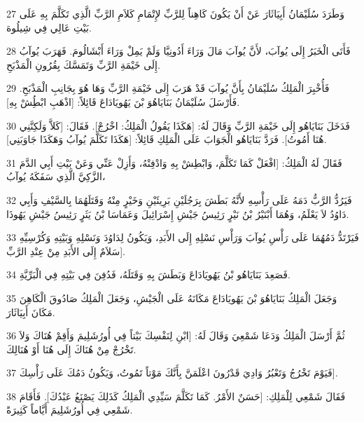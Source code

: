 \par 27 وَطَرَدَ سُلَيْمَانُ أَبِيَاثَارَ عَنْ أَنْ يَكُونَ كَاهِناً لِلرَّبِّ لإِتْمَامِ كَلاَمِ الرَّبِّ الَّذِي تَكَلَّمَ بِهِ عَلَى بَيْتِ عَالِي فِي شِيلُوهَ.
\par 28 فَأَتَى الْخَبَرُ إِلَى يُوآبَ، لأَنَّ يُوآبَ مَالَ وَرَاءَ أَدُونِيَّا وَلَمْ يَمِلْ وَرَاءَ أَبْشَالُومَ. فَهَرَبَ يُوآبُ إِلَى خَيْمَةِ الرَّبِّ وَتَمَسَّكَ بِقُرُونِ الْمَذْبَحِ.
\par 29 فَأُخْبِرَ الْمَلِكُ سُلَيْمَانُ بِأَنَّ يُوآبَ قَدْ هَرَبَ إِلَى خَيْمَةِ الرَّبِّ وَهَا هُوَ بِجَانِبِ الْمَذْبَحِ. فَأَرْسَلَ سُلَيْمَانُ بَنَايَاهُوَ بْنَ يَهُويَادَاعَ قَائِلاً: [اذْهَبِ ابْطُِشْ بِهِ].
\par 30 فَدَخَلَ بَنَايَاهُو إِلَى خَيْمَةِ الرَّبِّ وَقَالَ لَهُ: [هَكَذَا يَقُولُ الْمَلِكُ: اخْرُجْ]. فَقَالَ: [كَلاَّ وَلَكِنَّنِي هُنَا أَمُوتُ]. فَرَدَّ بَنَايَاهُو الْجَوَابَ عَلَى الْمَلِكِ قَائِلاً: [هَكَذَا تَكَلَّمَ يُوآبُ وَهَكَذَا جَاوَبَنِي].
\par 31 فَقَالَ لَهُ الْمَلِكُ: [افْعَلْ كَمَا تَكَلَّمَ، وَابْطِشْ بِهِ وَادْفِنْهُ، وَأَزِلْ عَنِّي وَعَنْ بَيْتِ أَبِي الدَّمَ الزَّكِيَّ الَّذِي سَفَكَهُ يُوآبُ،
\par 32 فَيَرُدُّ الرَّبُّ دَمَهُ عَلَى رَأْسِهِ لأَنَّهُ بَطَشَ بِرَجُلَيْنِ بَرِيئَيْنِ وَخَيْرٍ مِنْهُ وَقَتَلَهُمَا بِالسَّيْفِ وَأَبِي دَاوُدُ لاَ يَعْلَمُ، وَهُمَا أَبْنَيْرُ بْنُ نَيْرٍ رَئِيسُ جَيْشِ إِسْرَائِيلَ وَعَمَاسَا بْنُ يَثَرٍ رَئِيسُ جَيْشِ يَهُوذَا.
\par 33 فَيَرْتَدُّ دَمُهُمَا عَلَى رَأْسِ يُوآبَ وَرَأْسِ نَسْلِهِ إِلَى الأَبَدِ، وَيَكُونُ لِدَاوُدَ وَنَسْلِهِ وَبَيْتِهِ وَكُرْسِيِّهِ سَلاَمٌ إِلَى الأَبَدِ مِنْ عِنْدِ الرَّبِّ].
\par 34 فَصَعِدَ بَنَايَاهُو بْنُ يَهُويَادَاعَ وَبَطَشَ بِهِ وَقَتَلَهُ، فَدُفِنَ فِي بَيْتِهِ فِي الْبَرِّيَّةِ.
\par 35 وَجَعَلَ الْمَلِكُ بَنَايَاهُوَ بْنَ يَهُويَادَاعَ مَكَانَهُ عَلَى الْجَيْشِ، وَجَعَلَ الْمَلِكُ صَادُوقَ الْكَاهِنَ مَكَانَ أَبِيَاثَارَ.
\par 36 ثُمَّ أَرْسَلَ الْمَلِكُ وَدَعَا شَمْعِيَ وَقَالَ لَهُ: [ابْنِ لِنَفْسِكَ بَيْتاً فِي أُورُشَلِيمَ وَأَقِمْ هُنَاكَ وَلاَ تَخْرُجْ مِنْ هُنَاكَ إِلَى هُنَا أَوْ هُنَالِكَ.
\par 37 فَيَوْمَ تَخْرُجُ وَتَعْبُرُ وَادِيَ قَدْرُونَ اعْلَمَنَّ بِأَنَّكَ مَوْتاً تَمُوتُ، وَيَكُونُ دَمُكَ عَلَى رَأْسِكَ].
\par 38 فَقَالَ شَمْعِي لِلْمَلِكِ: [حَسَنٌ الأَمْرُ. كَمَا تَكَلَّمَ سَيِّدِي الْمَلِكُ كَذَلِكَ يَصْنَعُ عَبْدُكَ]. فَأَقَامَ شَمْعِي فِي أُورُشَلِيمَ أَيَّاماً كَثِيرَةً.
